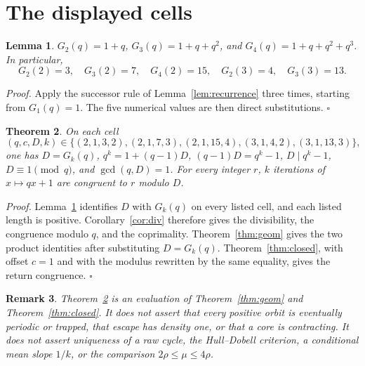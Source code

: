 \documentclass[11pt,letterpaper]{article}
\newtheorem{theorem}{Theorem}
\newtheorem{lemma}[theorem]{Lemma}
\newtheorem{remark}[theorem]{Remark}
\newenvironment{proof}{\noindent\textit{Proof.}}{\hfill\(\square\)}
\begin{document}
\section{The displayed cells}

\begin{lemma}
\label{lem:values}
\(G_2(q)=1+q\), \(G_3(q)=1+q+q^2\), and \(G_4(q)=1+q+q^2+q^3\). In particular,
\[
G_2(2)=3,\quad G_3(2)=7,\quad G_4(2)=15,\quad G_2(3)=4,\quad G_3(3)=13.
\]
\end{lemma}

\begin{proof}
Apply the successor rule of Lemma~\ref{lem:recurrence} three times, starting from \(G_1(q)=1\). The five numerical values are then direct substitutions.
\end{proof}

\begin{theorem}
\label{thm:cells}
On each cell
\[
(q,c,D,k)\in\bigl\{(2,1,3,2),(2,1,7,3),(2,1,15,4),(3,1,4,2),(3,1,13,3)\bigr\},
\]
one has \(D=G_k(q)\), \(q^k=1+(q-1)D\), \((q-1)D=q^k-1\), \(D\mid q^k-1\), \(D\equiv 1\pmod q\), and \(\gcd(q,D)=1\). For every integer \(r\), \(k\) iterations of \(x\mapsto qx+1\) are congruent to \(r\) modulo \(D\).
\end{theorem}

\begin{proof}
Lemma~\ref{lem:values} identifies \(D\) with \(G_k(q)\) on every listed cell, and each listed length is positive. Corollary~\ref{cor:div} therefore gives the divisibility, the congruence modulo \(q\), and the coprimality. Theorem~\ref{thm:geom} gives the two product identities after substituting \(D=G_k(q)\). Theorem~\ref{thm:closed}, with offset \(c=1\) and with the modulus rewritten by the same equality, gives the return congruence.
\end{proof}

\begin{remark}
Theorem~\ref{thm:cells} is an evaluation of Theorem~\ref{thm:geom} and Theorem~\ref{thm:closed}. It does not assert that every positive orbit is eventually periodic or trapped, that escape has density one, or that a core is contracting. It does not assert uniqueness of a raw cycle, the Hull–Dobell criterion, a conditional mean slope \(1/k\), or the comparison \(2\rho\le\mu\le 4\rho\).
\end{remark}
\end{document}
